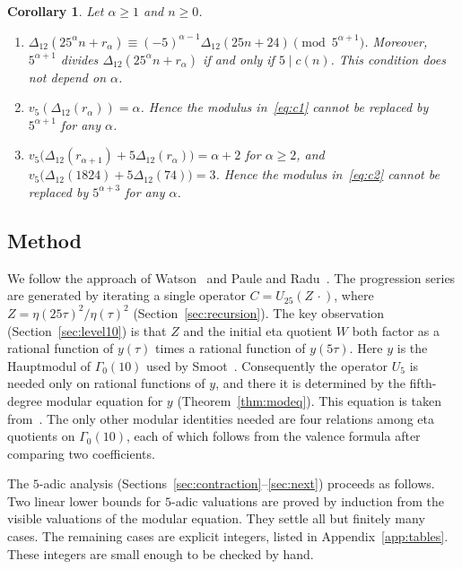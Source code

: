 \documentclass[11pt]{article}
\newtheorem{corollary}[theorem]{Corollary}
\theoremstyle{definition}
\theoremstyle{remark}
\numberwithin{equation}{section}
\begin{document}
\begin{corollary}\label{cor:sharp}
Let $\alpha\ge1$ and $n\ge0$.
\begin{enumerate}[label=\textup{(\alph*)}]
\item $\Delta_{12}(25^\alpha n+r_\alpha)\equiv(-5)^{\alpha-1}\Delta_{12}(25n+24)\pmod{5^{\alpha+1}}$. Moreover, $5^{\alpha+1}$ divides $\Delta_{12}(25^\alpha n+r_\alpha)$ if and only if $5\mid c(n)$. This condition does not depend on $\alpha$.
\item $v_5(\Delta_{12}(r_\alpha))=\alpha$. Hence the modulus in~\eqref{eq:c1} cannot be replaced by $5^{\alpha+1}$ for any $\alpha$.
\item $v_5\bigl(\Delta_{12}(r_{\alpha+1})+5\Delta_{12}(r_\alpha)\bigr)=\alpha+2$ for $\alpha\ge2$, and $v_5\bigl(\Delta_{12}(1824)+5\Delta_{12}(74)\bigr)=3$. Hence the modulus in~\eqref{eq:c2} cannot be replaced by $5^{\alpha+3}$ for any $\alpha$.
\end{enumerate}
\end{corollary}

\subsection*{Method}
We follow the approach of Watson~\cite{W} and Paule and Radu~\cite{PR}. The progression series are generated by iterating a single operator $C=U_{25}(Z\,\cdot)$, where $Z=\eta(25\tau)^2/\eta(\tau)^2$ (Section~\ref{sec:recursion}). The key observation (Section~\ref{sec:level10}) is that $Z$ and the initial eta quotient $W$ both factor as a rational function of $y(\tau)$ times a rational function of $y(5\tau)$. Here $y$ is the Hauptmodul of $\Gamma_0(10)$ used by Smoot~\cite{S}. Consequently the operator $U_5$ is needed only on rational functions of $y$, and there it is determined by the fifth-degree modular equation for $y$ (Theorem~\ref{thm:modeq}). This equation is taken from~\cite{S}. The only other modular identities needed are four relations among eta quotients on $\Gamma_0(10)$, each of which follows from the valence formula after comparing two coefficients.

The $5$-adic analysis (Sections~\ref{sec:contraction}--\ref{sec:next}) proceeds as follows. Two linear lower bounds for $5$-adic valuations are proved by induction from the visible valuations of the modular equation. They settle all but finitely many cases. The remaining cases are explicit integers, listed in Appendix~\ref{app:tables}. These integers are small enough to be checked by hand.
\end{document}
